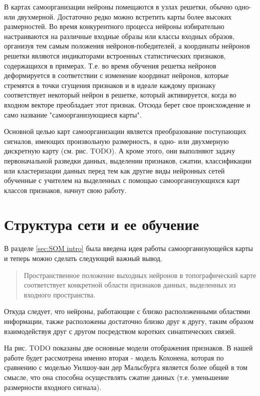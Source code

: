 \documentclass[a4paper,12pt]{report}
\begin{document}
В картах самоорганизации нейроны помещаются в узлах решетки, обычно
одно- или двухмерной. Достаточно редко можно встретить карты более
высоких размерностей. Во время конкурентного процесса нейроны
избирательно настраиваются на различные входные образы или классы
входных образов, организуя тем самым положения нейронов-победителей, а
координаты нейронов решетки являются индикаторами встроенных
статистических признаков, содержащихся в примерах. Т.е. во время
обучения решетка нейронов деформируется в соответствии с изменение
координат нейронов, которые стремятся в точки сгущения признаков и в
идеале каждому признаку соответствует некоторый нейрон в решетке,
который активируется, когда во входном векторе преобладает этот
признак. Отсюда берет свое происхождение и само название
"самоорганизующиеся карты".

Основной целью карт самоорганизации является преобразование
поступающих сигналов, имеющих произвольную размерность, в одно- или
двухмерную дискретную карту (см. рис. TODO). А кроме этого, они выполняют
задачу первоначальной разведки данных, выделении признаков, сжатии,
классификации или кластеризации данных перед тем как другие виды
нейронных сетей обученные с учителем на выделенных с помощью
самоорганизующихся карт классов признаков, начнут свою работу.

\section{Структура сети и ее обучение}
В разделе \ref{sec:SOM intro} была введена идея работы
самоорганизующейся карты и теперь можно сделать следующий важный
вывод.
\begin{quote}
    Пространственное положение выходных нейронов в топографический
    карте соответствует конкретной области признаков данных,
    выделенных из входного пространства.
\end{quote}
Откуда следует, что нейроны, работающие с близко расположенными
областями информации, также расположены достаточно близко друг к
другу, таким образом взаимодействуя друг с другом посредством коротких
синаптических связей.

На рис. TODO показаны две основные модели отображения признаков. В
нашей работе будет рассмотрена именно вторая - модель Кохонена,
которая по сравнению с моделью Уилшоу-ван дер Мальсбурга является
более общей в том смысле, что она способна осуществлять сжатие данных
(т.е. уменьшение размерности входного сигнала).
\end{document}
